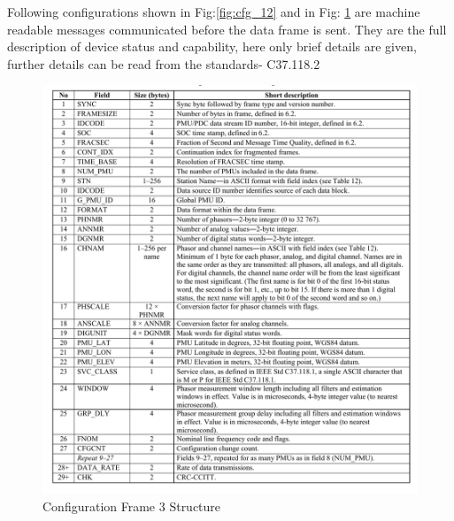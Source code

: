 Following configurations shown in Fig:\ref{fig:cfg_12} and in Fig: \ref{fig:cfg_3} are machine readable messages communicated before the data frame is sent. They are the full description of device status and capability, here only brief details are given, further details can be read from the standards- C37.118.2   
\begin{figure}[h]
	\includegraphics[width=\textwidth]{fig/cfg_frame3.png}
	\caption{Configuration Frame 3 Structure \cite{c37.118.2}}
		\label{fig:cfg_3}
\end{figure} 